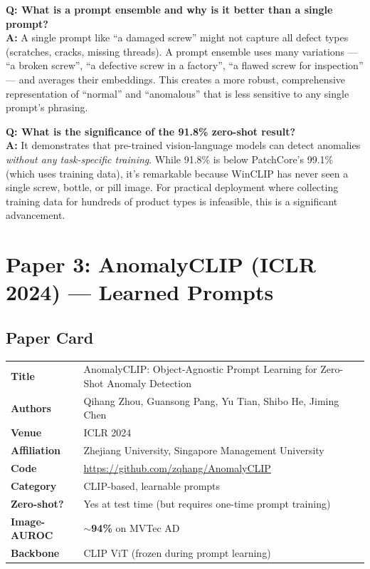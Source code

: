 \documentclass[12pt, a4paper]{article}
\begin{document}
\begin{vivaqa}
\textbf{Q: What is a prompt ensemble and why is it better than a single prompt?}\\[4pt]
\textbf{A:} A single prompt like ``a damaged screw'' might not capture all defect types (scratches, cracks, missing threads). A prompt ensemble uses many variations --- ``a broken screw'', ``a defective screw in a factory'', ``a flawed screw for inspection'' --- and averages their embeddings. This creates a more robust, comprehensive representation of ``normal'' and ``anomalous'' that is less sensitive to any single prompt's phrasing.
\end{vivaqa}

\begin{vivaqa}
\textbf{Q: What is the significance of the 91.8\% zero-shot result?}\\[4pt]
\textbf{A:} It demonstrates that pre-trained vision-language models can detect anomalies \textit{without any task-specific training}. While 91.8\% is below PatchCore's 99.1\% (which uses training data), it's remarkable because WinCLIP has never seen a single screw, bottle, or pill image. For practical deployment where collecting training data for hundreds of product types is infeasible, this is a significant advancement.
\end{vivaqa}



\section{Paper 3: AnomalyCLIP (ICLR 2024) --- Learned Prompts}

\subsection{Paper Card}
\begin{tabularx}{\textwidth}{@{}lX@{}}
\toprule
\textbf{Title} & AnomalyCLIP: Object-Agnostic Prompt Learning for Zero-Shot Anomaly Detection \\
\textbf{Authors} & Qihang Zhou, Guansong Pang, Yu Tian, Shibo He, Jiming Chen \\
\textbf{Venue} & ICLR 2024 \\
\textbf{Affiliation} & Zhejiang University, Singapore Management University \\
\textbf{Code} & \url{https://github.com/zqhang/AnomalyCLIP} \\
\textbf{Category} & CLIP-based, learnable prompts \\
\textbf{Zero-shot?} & Yes at test time (but requires one-time prompt training) \\
\textbf{Image-AUROC} & $\sim$\textbf{94\%} on MVTec AD \\
\textbf{Backbone} & CLIP ViT (frozen during prompt learning) \\
\bottomrule
\end{tabularx}
\end{document}
